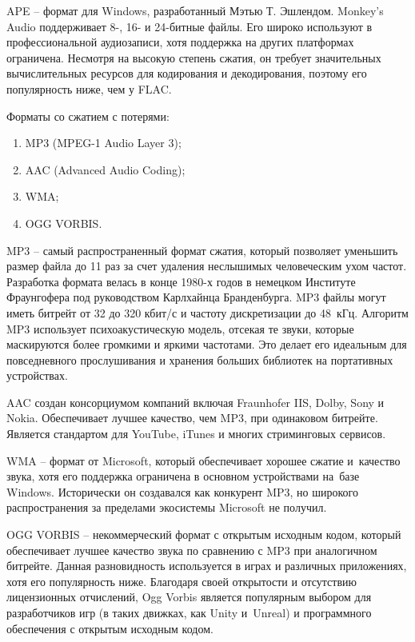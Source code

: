 \documentclass{ou}
\begin{document}
APE -- формат для Windows, разработанный Мэтью Т. Эшлендом. Monkey's Audio поддерживает 8-, 16- и 24-битные файлы. Его широко используют в профессиональной аудиозаписи, хотя поддержка на других платформах ограничена. Несмотря на высокую степень сжатия, он требует значительных вычислительных ресурсов для кодирования и декодирования, поэтому его популярность ниже, чем у FLAC.

Форматы со сжатием с потерями:
\begin{enumerate}[leftmargin=0em, itemindent=3.75em, nosep, label=\arabic*)]
\item MP3 (MPEG-1 Audio Layer 3);
\item AAC (Advanced Audio Coding);
\item WMA;
\item OGG VORBIS.
\end{enumerate}

MP3 -- самый распространенный формат сжатия, который позволяет уменьшить размер файла до 11 раз за счет удаления неслышимых человеческим ухом частот. Разработка формата велась в конце 1980-х годов в немецком Институте Фраунгофера под руководством Карлхайнца Бранденбурга. MP3 файлы могут иметь битрейт от 32 до 320 кбит/с и частоту дискретизации до 48~кГц. Алгоритм MP3 использует психоакустическую модель, отсекая те звуки, которые маскируются более громкими и яркими частотами. Это делает его идеальным для повседневного прослушивания и хранения больших библиотек на портативных устройствах.

AAC создан консорциумом компаний включая Fraunhofer IIS, Dolby, Sony и Nokia. Обеспечивает лучшее качество, чем MP3, при одинаковом битрейте. Является стандартом для YouTube, iTunes и многих стриминговых сервисов.

WMA -- формат от Microsoft, который обеспечивает хорошее сжатие и~качество звука, хотя его поддержка ограничена в основном устройствами на~базе Windows. Исторически он создавался как конкурент MP3, но широкого распространения за пределами экосистемы Microsoft не получил.

OGG VORBIS -- некоммерческий формат с открытым исходным кодом, который обеспечивает лучшее качество звука по сравнению с MP3 при аналогичном битрейте. Данная разновидность используется в играх и различных приложениях, хотя его популярность ниже. Благодаря своей открытости и отсутствию лицензионных отчислений, Ogg Vorbis является популярным выбором для разработчиков игр (в таких движках, как Unity и~Unreal) и программного обеспечения с открытым исходным кодом.
\end{document}
